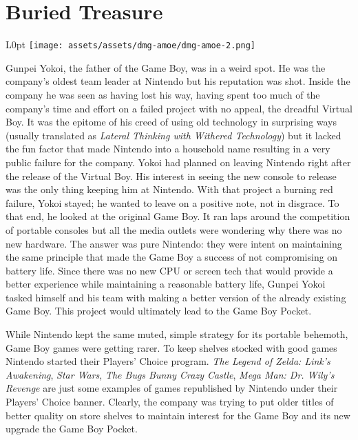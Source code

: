 \documentclass{book}
\begin{document}
\FloatBarrier\needspace{10mm}\section*{Buried Treasure}\nopagebreak[4]
\begin{wrapfigure}{L}{0pt} \texttt{[image: assets/assets/dmg-amoe/dmg-amoe-2.png]}\end{wrapfigure}
Gunpei Yokoi, the father of the Game Boy, was in a weird spot. He was the company’s oldest team leader at Nintendo but his reputation was shot. Inside the company he was seen as having lost his way, having spent too much of the company’s time and effort on a failed project with no appeal, the dreadful Virtual Boy. It was the epitome of his creed of using old technology in surprising ways (usually translated as \emph{Lateral Thinking with Withered Technology}) but it lacked the fun factor that made Nintendo into a household name resulting in a very public failure for the company. Yokoi had planned on leaving Nintendo right after the release of the Virtual Boy. His interest in seeing the new console to release was the only thing keeping him at Nintendo. With that project a burning red failure, Yokoi stayed; he wanted to leave on a positive note, not in disgrace. To that end, he looked at the original Game Boy. It ran laps around the competition of portable consoles but all the media outlets were wondering why there was no new hardware. The answer was pure Nintendo: they were intent on maintaining the same principle that made the Game Boy a success of not compromising on battery life. Since there was no new CPU or screen tech that would provide a better experience while maintaining a reasonable battery life, Gunpei Yokoi tasked himself and his team with making a better version of the already existing Game Boy. This project would ultimately lead to the Game Boy Pocket.

While Nintendo kept the same muted, simple strategy for its portable behemoth, Game Boy games were getting rarer. To keep shelves stocked with good games Nintendo started their Players’ Choice program. \emph{The Legend of Zelda: Link’s Awakening}, \emph{Star Wars}, \emph{The Bugs Bunny Crazy Castle}, \emph{Mega Man: Dr. Wily’s Revenge} are just some examples of games republished by Nintendo under their Players’ Choice banner. Clearly, the company was trying to put older titles of better quality on store shelves to maintain interest for the Game Boy and its new upgrade the Game Boy Pocket.
\end{document}
